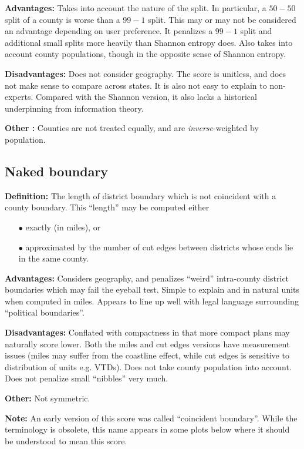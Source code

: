 \documentclass{mgggarticle}
\begin{document}
\textbf{Advantages: } Takes into account the nature of the split. In particular, a $50-50$ split of a county is worse than a $99-1$ split. This may or may not be considered an advantage depending on user preference. It penalizes a $99-1$ split and additional small splits more heavily than Shannon entropy does. Also takes into account county populations, though in the opposite sense of Shannon entropy.

\textbf{Disadvantages: } Does not consider geography. The score is unitless, and does not make sense to compare across states. It is also not easy to explain to non-experts. Compared with the Shannon version, it also lacks a historical underpinning from information theory.

\textbf{Other : } Counties are not treated equally, and are \emph{inverse}-weighted by population.


\subsection{Naked boundary}
\textbf{Definition: } The length of district boundary which is not coincident with a county boundary. This ``length'' may be computed either
\begin{enumerate}
\item[{\small$\bullet$}] exactly (in miles), or
\item[{\small$\bullet$}] approximated by the number of cut edges between districts whose ends lie in the same county.
\end{enumerate} 

\textbf{Advantages: } Considers geography, and penalizes ``weird'' intra-county district boundaries which may fail the eyeball test. Simple to explain and in natural units when computed in miles. Appears to line up well with legal language surrounding ``political boundaries''.

\textbf{Disadvantages: } Conflated with compactness in that more compact plans may naturally score lower. Both the miles and cut edges versions have measurement issues (miles may suffer from the coastline effect, while cut edges is sensitive to distribution of units e.g. VTDs). Does not take county population into account. Does not penalize small ``nibbles'' very much.

\textbf{Other: } Not symmetric. 

\textbf{Note: } An early version of this score was called ``coincident boundary''. While the terminology is obsolete, this name appears in some plots below where it should be understood to mean this score.
\end{document}
